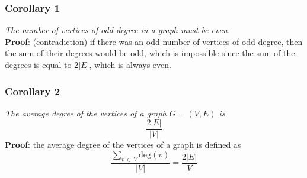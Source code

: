 \documentclass{report}
\begin{document}
\subsubsection{Corollary 1}
\textit{The number of vertices of odd degree in a graph must be even.}\\
\textbf{Proof}: (contradiction) if there was an odd number of vertices of odd degree, then the sum of their degrees would be odd, which is impossible since the sum of the degrees is equal to $2 \vert E \vert$, which is always even.

\subsubsection{Corollary 2}
\textit{The average degree of the vertices of a graph $G = (V, E)$ is}
\begin{equation}
\frac{2 \vert E \vert}{\vert V \vert}
\end{equation}
\textbf{Proof}: the average degree of the vertices of a graph is defined as
$$\frac{\displaystyle\sum_{v \,\in\, V} \mathrm{deg}(v)}{\vert V \vert} = \frac{2 \vert E \vert}{\vert V \vert}$$
\end{document}

